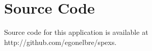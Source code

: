 \chapter{Source Code}
\label{add:files}

Source code for this application is available at http://github.com/egonelbre/spexs.